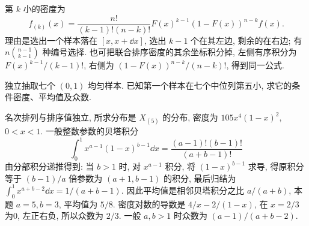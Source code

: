 第 $k$ 小的密度为
\[f_{(k)}(x)=\frac{n!}{(k-1)!(n-k)!}F(x)^{k-1}(1-F(x))^{n-k}f(x).\]
理由是选出一个样本落在 $[x,x+\dd x]$, 选出 $k-1$ 个在其左边, 剩余的在右边; 有 $n\binom{n-1}{k-1}$ 种编号选择. 也可把联合排序密度的其余坐标积分掉, 左侧有序积分为 $F(x)^{k-1}/(k-1)!$, 右侧为 $(1-F(x))^{n-k}/(n-k)!$, 得到同一公式.
\begin{example}
独立抽取七个 $(0,1)$ 均匀样本. 已知第一个样本在七个中位列第五小, 求它的条件密度、平均值及众数.
\end{example}
\begin{solution}
名次排列与排序值独立, 所求分布是 $X_{(5)}$ 的分布, 密度为 $105x^4(1-x)^2$, $0<x<1$. 一般整数参数的贝塔积分
\[\int_0^1x^{a-1}(1-x)^{b-1}\dd x=\frac{(a-1)!(b-1)!}{(a+b-1)!}\]
由分部积分递推得到: 当 $b>1$ 时, 对 $x^{a-1}$ 积分, 将 $(1-x)^{b-1}$ 求导, 得原积分等于 $(b-1)/a$ 倍参数为 $(a+1,b-1)$ 的积分, 最后归结为 $\int_0^1x^{a+b-2}\dd x=1/(a+b-1)$. 因此平均值是相邻贝塔积分之比 $a/(a+b)$, 本题 $a=5,b=3$, 平均值为 $5/8$. 密度对数的导数是 $4/x-2/(1-x)$, 在 $x=2/3$ 为0, 左正右负, 所以众数为 $2/3$. 一般 $a,b>1$ 时众数为 $(a-1)/(a+b-2)$.
\end{solution}

